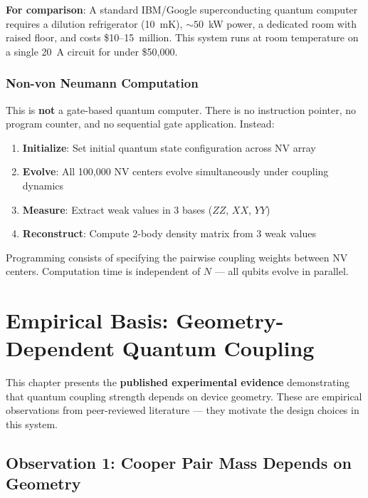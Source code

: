 \documentclass[11pt,a4paper,openany]{book}
\begin{document}
\noindent
\textbf{For comparison}: A standard IBM/Google superconducting quantum computer requires a dilution refrigerator (10~mK), ${\sim}50$~kW power, a dedicated room with raised floor, and costs \$10--15~million. This system runs at room temperature on a single 20~A circuit for under \$50,000.

\subsection{Non-von Neumann Computation}

This is \textbf{not} a gate-based quantum computer. There is no instruction pointer, no program counter, and no sequential gate application. Instead:

\begin{enumerate}[nosep]
  \item \textbf{Initialize}: Set initial quantum state configuration across NV array
  \item \textbf{Evolve}: All 100,000 NV centers evolve simultaneously under coupling dynamics
  \item \textbf{Measure}: Extract weak values in 3 bases ($ZZ$, $XX$, $YY$)
  \item \textbf{Reconstruct}: Compute 2-body density matrix from 3 weak values
\end{enumerate}

Programming consists of specifying the pairwise coupling weights between NV centers. Computation time is independent of $N$ --- all qubits evolve in parallel.


\chapter{Empirical Basis: Geometry-Dependent Quantum Coupling}\label{ch:empirical}

This chapter presents the \textbf{published experimental evidence} demonstrating that quantum coupling strength depends on device geometry. These are empirical observations from peer-reviewed literature --- they motivate the design choices in this system.

\section{Observation 1: Cooper Pair Mass Depends on Geometry}
\end{document}
